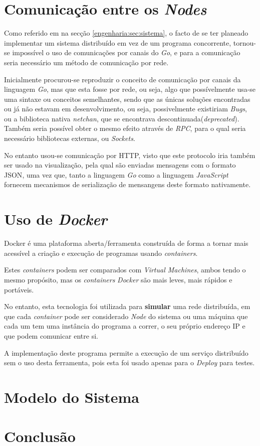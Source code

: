 \section{Comunicação entre os \emph{Nodes}}
\label{engenharia:sec:comunicação}
Como referido em na secção \ref{engenharia:sec:sistema}, o facto de se ter planeado implementar um sistema distribuído
em vez de um programa concorrente, tornou-se impossível o uso de comunicações por canais do \emph{Go}, 
e para a comunicação seria necessário um método de comunicação por rede.

Inicialmente procurou-se reproduzir o conceito de comunicação por canais da linguagem \emph{Go}, mas que esta fosse por rede, ou seja, algo que possívelmente
usa-se uma sintaxe ou conceitos semelhantes, sendo que as únicas soluções encontradas ou já não estavam em desenvolvimento, ou seja, possivelmente existiriam \emph{Bugs}, 
ou a biblioteca nativa \emph{netchan}, que se encontrava descontinuada(\emph{deprecated}). 
Também seria possível obter o mesmo efeito através de \emph{RPC}, para o qual seria necessário bibliotecas externas, 
ou \emph{Sockets}.

No entanto usou-se comunicação por \acs*{HTTP}, visto que este protocolo iria também ser usado na visualização,
pela qual são enviadas mensagens com o formato \acs*{JSON}, uma vez que, tanto a linguagem \emph{Go} como a linguagem 
\emph{JavaScript} fornecem mecanismos de serialização de mensangens deste formato nativamente.


\section{Uso de \emph{Docker}}
Docker é uma plataforma aberta/ferramenta construída de forma a tornar mais acessível a criação e execução de programas  usando \emph{containers}.

Estes \emph{containers} podem ser comparados com \emph{Virtual Machines}, ambos tendo o mesmo propósito, mas os \emph{containers} \emph{Docker} são mais leves, mais rápidos e portáveis.

No entanto, esta tecnologia foi utilizada para \textbf{simular} uma rede distribuída,
em que cada \emph{container} pode ser considerado \emph{Node} do sistema ou uma máquina que cada um tem uma instância do programa a correr,
o seu próprio endereço \acs{IP} e que podem comunicar entre si.

A implementação deste programa permite a execução de um serviço distribuído sem o uso desta ferramenta, pois esta foi
usado apenas para o \emph{Deploy} para testes.

\section{Modelo do Sistema}




\section{Conclusão}
\label{engenharia:sec:introducao}

